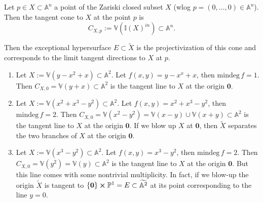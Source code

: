 \begin{defn}
	Let $p \in X \subset \mathbb{A}^{n}$ a point of the Zariski closed subset $X$
	(wlog $p = \left( 0, \ldots, 0 \right) \in \mathbb{A}^{n}$).
	Then the tangent cone to $X$ at the point $p$ is
	\begin{equation}
		C_{X,p} := \mathbb{V}\left( \mathbb{I}(X)^{in} \right) \subset \mathbb{A}^{n}
	.\end{equation} 
\end{defn}
\begin{rem}[]
	Then the exceptional hypersurface $E \subset \widetilde{X}$ is the projectivization of this cone
	and corresponds to the limit tangent directions to $X$ at $p$.
\end{rem}

\begin{ex}\leavevmode\vspace{-.2\baselineskip}
\begin{enumerate}
	\item Let $X:= \mathbb{V}\left( y - x^2 + x \right) \subset \mathbb{A}^{2}$.
		Let $f(x,y) = y-x^x + x$, then $\mathrm{mindeg}\, f = 1$.
		Then $C_{X,0} = \mathbb{V}\left( y + x \right) \subset \mathbb{A}^{2}$ is the tangent line to $X$
		at the origin $\mathbf{0}$.
	\item Let $X:= \mathbb{V}\left( x^2 + x^3 -y^2 \right) \subset \mathbb{A}^{2}$.
		Let $f(x,y) = x^2 + x^3 - y^2$, then $\mathrm{mindeg}\, f = 2$.
		Then $C_{X,0} = \mathbb{V}\left( x^2 - y^2 \right) = \mathbb{V}\left( x - y \right) \cup
		\mathbb{V}\left( x + y \right) \subset \mathbb{A}^{2}$ is the tangent line to $X$
		at the origin $\mathbf{0}$.
		If we blow up $X$ at $\mathbf{0}$, then $\widetilde{X}$ separates the two branches 
		of $X$ at the origin $\mathbf{0}$.
	\item Let $X:= \mathbb{V}\left( x^3 -y^2 \right) \subset \mathbb{A}^{2}$.
		Let $f(x,y) = x^3 - y^2$, then $\mathrm{mindeg}\, f = 2$.
		Then $C_{X,0} = \mathbb{V}\left( y^2 \right) = \mathbb{V}\left( y \right)
		\subset \mathbb{A}^{2}$ is the tangent line to $X$
		at the origin $\mathbf{0}$.
		But this line comes with some nontrivial multiplicity.
		In fact, if we blow-up the origin $\widetilde{X}$ is tangent
		to $\left\{ \mathbf{0} \right\} \cross \mathbb{P}^{1} = E \subset \widetilde{\mathbb{A}^{2}}$
		at its point corresponding to the line $y = 0$.
\end{enumerate}
\end{ex} 

